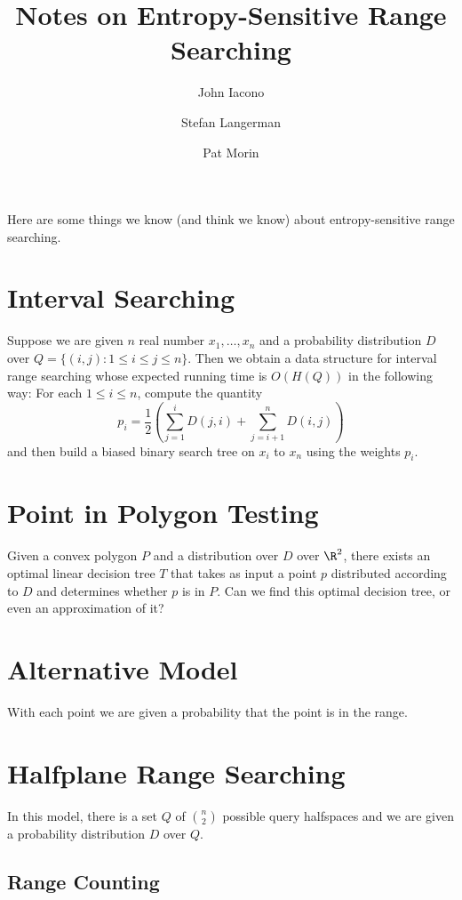 \documentclass{article}
\title{Notes on Entropy-Sensitive Range Searching}
\author{John Iacono \and Stefan Langerman \and Pat Morin}
\begin{document}
\maketitle

Here are some things we know (and think we know) about
entropy-sensitive range searching.

\section{Interval Searching}

Suppose we are given $n$ real number $x_1,\ldots,x_n$ and a
probability distribution $D$ over $Q=\{(i,j): 1\le i\le j\le n\}$.
Then we obtain a data structure for interval range searching whose
expected running time is $O(H(Q))$ in the following way:  For each
$1\le i\le n$, compute the quantity
\[
	p_i = \frac{1}{2}\left(\sum_{j=1}^i D(j,i) + \sum_{j=i+1}^n D(i,j)\right)
\]
and then build a biased binary search tree on $x_i$ to $x_n$ using the
weights $p_i$.

\section{Point in Polygon Testing}

Given a convex polygon $P$ and a distribution over $D$ over $\R^2$,
there exists an optimal linear decision tree $T$ that takes as input a
point $p$ distributed according to $D$ and determines whether $p$ is
in $P$.  Can we find this optimal decision tree, or even an
approximation of it?

\section{Alternative Model}

With each point we are given a probability that the point is in the
range.

\section{Halfplane Range Searching}

In this model, there is a set $Q$ of ${n \choose 2}$ possible query
halfspaces and we are given a probability distribution $D$ over $Q$.

\subsection{Range Counting}
\end{document}
